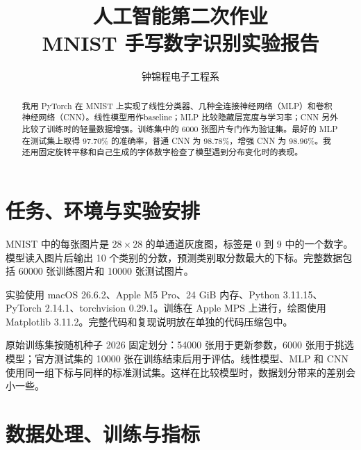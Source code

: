 \documentclass[11pt,a4paper]{ctexart}
\title{人工智能第二次作业\\MNIST 手写数字识别实验报告}
\author{钟锦程\quad 2026210748\quad 电子工程系}
\date{}
\begin{document}
\maketitle
\begin{abstract}
我用 PyTorch 在 MNIST 上实现了线性分类器、几种全连接神经网络（MLP）和卷积神经网络（CNN）。线性模型用作baseline；MLP 比较隐藏层宽度与学习率；CNN 另外比较了训练时的轻量数据增强。训练集中的 6000 张图片专门作为验证集。最好的 MLP 在测试集上取得 97.70\% 的准确率，普通 CNN 为 98.78\%，增强 CNN 为 98.96\%。我还用固定旋转平移和自己生成的字体数字检查了模型遇到分布变化时的表现。
\end{abstract}
\setcounter{tocdepth}{1}
\tableofcontents
\newpage

\section{任务、环境与实验安排}
MNIST 中的每张图片是 $28\times28$ 的单通道灰度图，标签是 0 到 9 中的一个数字。模型读入图片后输出 10 个类别的分数，预测类别取分数最大的下标。完整数据包括 60000 张训练图片和 10000 张测试图片。

实验使用 macOS 26.6.2、Apple M5 Pro、24 GiB 内存、Python 3.11.15、PyTorch 2.14.1、torchvision 0.29.1。训练在 Apple MPS 上进行，绘图使用 Matplotlib 3.11.2。完整代码和复现说明放在单独的代码压缩包中。

原始训练集按随机种子 2026 固定划分：54000 张用于更新参数，6000 张用于挑选模型；官方测试集的 10000 张在训练结束后用于评估。线性模型、MLP 和 CNN 使用同一组下标与同样的标准测试集。这样在比较模型时，数据划分带来的差别会小一些。

\section{数据处理、训练与指标}
\end{document}
